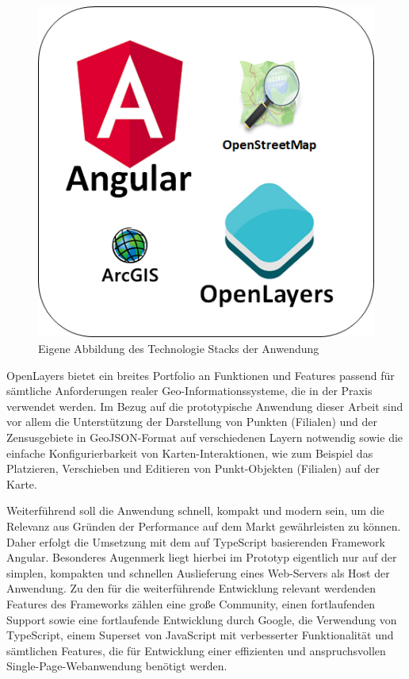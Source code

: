 \begin{figure}[H]
	\centering
	\includegraphics[]{resources/images/tech_stack.png}
	\caption{Eigene Abbildung des Technologie Stacks der Anwendung}
	\label{img:tech_stack}
\end{figure}

OpenLayers bietet ein breites Portfolio an Funktionen und Features passend für sämtliche Anforderungen realer Geo-Informationssysteme, die in der Praxis verwendet werden. 
Im Bezug auf die prototypische Anwendung dieser Arbeit sind vor allem die Unterstützung der Darstellung von Punkten (Filialen) und der Zensusgebiete in GeoJSON-Format auf verschiedenen Layern notwendig sowie die einfache Konfigurierbarkeit von Karten-Interaktionen, wie zum Beispiel das Platzieren, Verschieben und Editieren von Punkt-Objekten (Filialen) auf der Karte.

Weiterführend soll die Anwendung schnell, kompakt und modern sein, um die Relevanz aus Gründen der Performance auf dem Markt gewährleisten zu können. 
Daher erfolgt die Umsetzung mit dem auf TypeScript basierenden Framework Angular. Besonderes Augenmerk liegt hierbei im Prototyp eigentlich nur auf der simplen, kompakten und schnellen Auslieferung eines Web-Servers als Host der Anwendung. Zu den für die weiterführende Entwicklung relevant werdenden Features des Frameworks zählen eine große Community, einen fortlaufenden Support sowie eine fortlaufende Entwicklung durch Google, die Verwendung von TypeScript, einem Superset von JavaScript mit verbesserter Funktionalität und sämtlichen Features, die für Entwicklung einer effizienten und anspruchsvollen Single-Page-Webanwendung benötigt werden. 